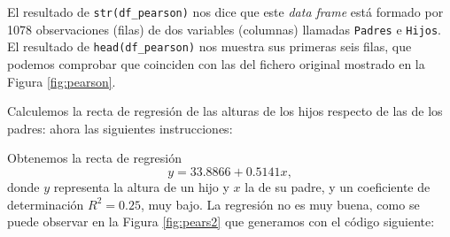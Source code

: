 \documentclass[
]{book}
\newenvironment{Shaded}{\begin{snugshade}}{\end{snugshade}}
\newcommand{\CommentTok}[1]{\textcolor[rgb]{0.56,0.35,0.01}{\textit{#1}}}
\newcommand{\DataTypeTok}[1]{\textcolor[rgb]{0.13,0.29,0.53}{#1}}
\newcommand{\KeywordTok}[1]{\textcolor[rgb]{0.13,0.29,0.53}{\textbf{#1}}}
\newcommand{\NormalTok}[1]{#1}
\newcommand{\OperatorTok}[1]{\textcolor[rgb]{0.81,0.36,0.00}{\textbf{#1}}}
\theoremstyle{definition}
\theoremstyle{definition}
\theoremstyle{definition}
\theoremstyle{remark}
\begin{document}
\begin{Shaded}
\end{Shaded}

El resultado de \texttt{str(df\_pearson)} nos dice que este \emph{data frame} está formado por 1078 observaciones (filas) de dos variables (columnas) llamadas \texttt{Padres} e \texttt{Hijos}. El resultado de \texttt{head(df\_pearson)} nos muestra sus primeras seis filas, que podemos comprobar que coinciden con las del fichero original mostrado en la Figura \ref{fig:pearson}.

Calculemos la recta de regresión de las alturas de los hijos respecto de las de los padres: ahora las siguientes instrucciones:

\begin{Shaded}
\end{Shaded}

Obtenemos la recta de regresión
\[
y=33.8866+0.5141x,
\]
donde \(y\) representa la altura de un hijo y \(x\) la de su padre, y un coeficiente de determinación \(R^2=0.25\),
muy bajo. La regresión no es muy buena, como se puede observar en la Figura \ref{fig:pears2} que generamos con el código siguiente:
\end{document}
